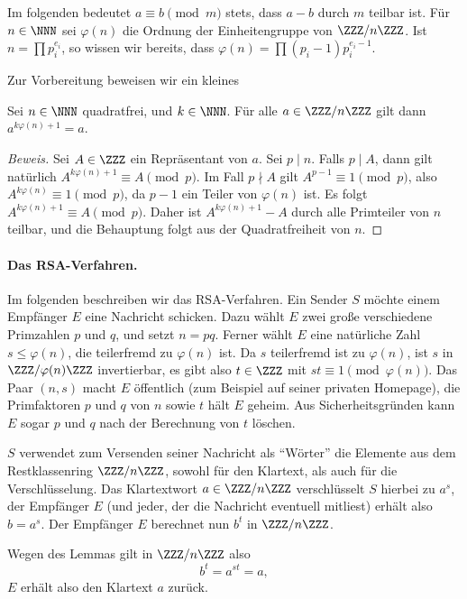 \documentclass[12pt,a4paper,twoside]{article}
\begin{document}
Im folgenden bedeutet $a\equiv b\pmod{m}$ stets, dass $a-b$ durch $m$ teilbar
ist. F\"ur $n\in\NNN$ sei $\varphi(n)$ die Ordnung der Einheitengruppe von
$\ZZZ/n\ZZZ$. Ist $n=\prod p_i^{e_i}$, so wissen wir bereits, dass
$\varphi(n)=\prod (p_i-1)p_i^{e_i-1}$.

Zur Vorbereitung beweisen wir ein kleines
\begin{Lemma}
  Sei $n\in\NNN$ quadratfrei, und $k\in\NNN$. F\"ur alle $a\in\ZZZ/n\ZZZ$ gilt
  dann $a^{k\varphi(n)+1}=a$.
\end{Lemma}
\begin{proof}[Beweis]
  Sei $A\in\ZZZ$ ein Repr\"asentant von $a$. Sei $p\mid n$. Falls $p\mid A$,
  dann gilt nat\"urlich $A^{k\varphi(n)+1}\equiv A\pmod{p}$. Im Fall $p\nmid
  A$ gilt $A^{p-1}\equiv 1\pmod{p}$, also $A^{k\varphi(n)}\equiv 1\pmod{p}$,
  da $p-1$ ein Teiler von $\varphi(n)$ ist. Es folgt $A^{k\varphi(n)+1}\equiv
  A\pmod{p}$. Daher ist $A^{k\varphi(n)+1}-A$ durch alle Primteiler von $n$
  teilbar, und die Behauptung folgt aus der Quadratfreiheit von $n$.
\end{proof}
\paragraph{Das RSA-Verfahren.}
Im folgenden beschreiben wir das RSA-Verfahren. Ein Sender $S$ m\"ochte einem
Empf\"anger $E$ eine Nachricht schicken. Dazu w\"ahlt $E$ zwei gro\ss e
verschiedene Primzahlen $p$ und $q$, und setzt $n=pq$. Ferner w\"ahlt $E$ eine
nat\"urliche Zahl $s\le\varphi(n)$, die teilerfremd zu $\varphi(n)$ ist.  Da
$s$ teilerfremd ist zu $\varphi(n)$, ist $s$ in $\ZZZ/\varphi(n)\ZZZ$
invertierbar, es gibt also $t\in\ZZZ$ mit $st\equiv1\pmod{\varphi(n)}$.  Das
Paar $(n,s)$ macht $E$ \"offentlich (zum Beispiel auf seiner privaten
Homepage), die Primfaktoren $p$ und $q$ von $n$ sowie $t$ h\"alt $E$ geheim.
Aus Sicherheitsgr\"unden kann $E$ sogar $p$ und $q$ nach der Berechnung von
$t$ l\"oschen.

$S$ verwendet zum Versenden seiner Nachricht als ``W\"orter'' die Elemente aus
dem Restklassenring $\ZZZ/n\ZZZ$, sowohl f\"ur den Klartext, als auch f\"ur
die Verschl\"usselung. Das Klartextwort $a\in\ZZZ/n\ZZZ$ verschl\"usselt $S$
hierbei zu $a^s$, der Empf\"anger $E$ (und jeder, der die Nachricht eventuell
mitliest) erh\"alt also $b=a^s$. Der Empf\"anger $E$ berechnet nun $b^t$ in
$\ZZZ/n\ZZZ$.

Wegen des Lemmas gilt in $\ZZZ/n\ZZZ$ also
\[
b^t=a^{st}=a,
\]
$E$ erh\"alt also den Klartext $a$ zur\"uck.
\end{document}

